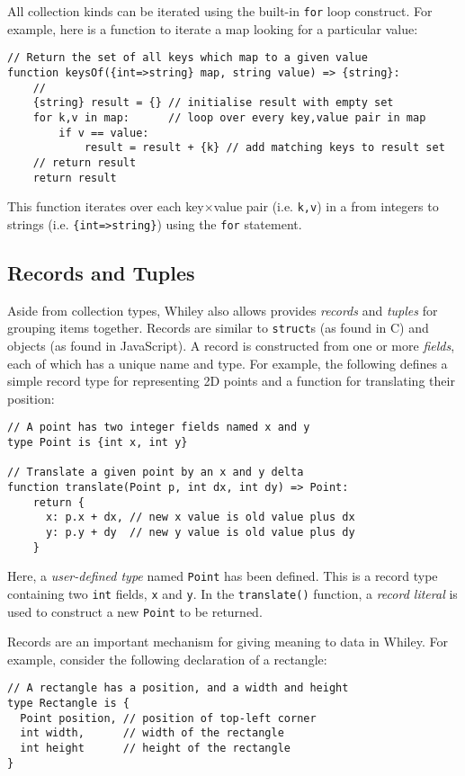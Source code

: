 All collection kinds can be iterated using the built-in
\lstinline{for} loop construct.  For example, here is a function to iterate a map looking for a particular value:

\begin{lstlisting}
// Return the set of all keys which map to a given value
function keysOf({int=>string} map, string value) => {string}:
    //
    {string} result = {} // initialise result with empty set
    for k,v in map:      // loop over every key,value pair in map
        if v == value:
            result = result + {k} // add matching keys to result set
    // return result
    return result
\end{lstlisting}

\noindent This function iterates over each key$\times$value pair (i.e. \lstinline{k,v}) in a from integers to strings (i.e. \lstinline|{int=>string}|) using the \lstinline{for} statement.

\subsection{Records and Tuples}
Aside from collection types, Whiley also allows provides {\em records} and {\em tuples} for grouping items together.  Records are similar to \lstinline{struct}s (as found in C) and objects (as found in JavaScript).  A record is constructed from one or more {\em fields}, each of which has a unique name and type.  For example, the following defines a simple record type for representing 2D points and a function for translating their position:
\begin{lstlisting}
// A point has two integer fields named x and y
type Point is {int x, int y}

// Translate a given point by an x and y delta
function translate(Point p, int dx, int dy) => Point:
    return { 
      x: p.x + dx, // new x value is old value plus dx
      y: p.y + dy  // new y value is old value plus dy
    }
\end{lstlisting}
Here, a {\em user-defined type} named \lstinline{Point} has been defined.  This is a record type containing two \lstinline{int} fields, \lstinline{x} and \lstinline{y}.  In the \lstinline{translate()} function, a {\em record literal} is used to construct a new \lstinline{Point} to be returned.

Records are an important mechanism for giving meaning to data in Whiley.  For example, consider the following declaration of a rectangle:

\begin{lstlisting}
// A rectangle has a position, and a width and height
type Rectangle is {
  Point position, // position of top-left corner
  int width,      // width of the rectangle
  int height      // height of the rectangle
}
\end{lstlisting}

